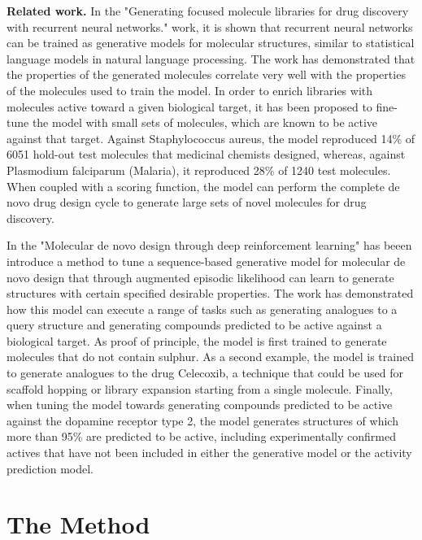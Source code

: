 \documentclass[a4paper]{article}
\newcommand{\mypar}[1]{{\bf #1.}}
\begin{document}
\mypar{Related work} 
In the "Generating focused molecule libraries for drug discovery with recurrent neural networks." \cite{generating-focused-molecule} work, it is shown that recurrent neural networks can be trained as generative models for molecular structures, similar to statistical language models in natural language processing. The work has demonstrated that the properties of the generated molecules correlate very well with the properties of the molecules used to train the model. In order to enrich libraries with molecules active toward a given biological target, it has been proposed to fine-tune the model with small sets of molecules, which are known to be active against that target. Against Staphylococcus aureus, the model reproduced 14\% of 6051 hold-out test molecules that medicinal chemists designed, whereas, against Plasmodium falciparum (Malaria), it reproduced 28\% of 1240 test molecules. When coupled with a scoring function, the model can perform the complete de novo drug design cycle to generate large sets of novel molecules for drug discovery. 



In the "Molecular de novo design through deep reinforcement learning" \cite{molecular-denovo-design} has beeen introduce a method to tune a sequence-based generative model for molecular de novo design that through augmented episodic likelihood can learn to generate structures with certain specified desirable properties. The work has demonstrated how this model can execute a range of tasks such as generating analogues to a query structure and generating compounds predicted to be active against a biological target. As proof of principle, the model is first trained to generate molecules that do not contain sulphur. As a second example, the model is trained to generate analogues to the drug Celecoxib, a technique that could be used for scaffold hopping or library expansion starting from a single molecule. Finally, when tuning the model towards generating compounds predicted to be active against the dopamine receptor type 2, the model generates structures of which more than 95\% are predicted to be active, including experimentally confirmed actives that have not been included in either the generative model or the activity prediction model.

\section{The Method}\label{sec:The Method}
\end{document}
